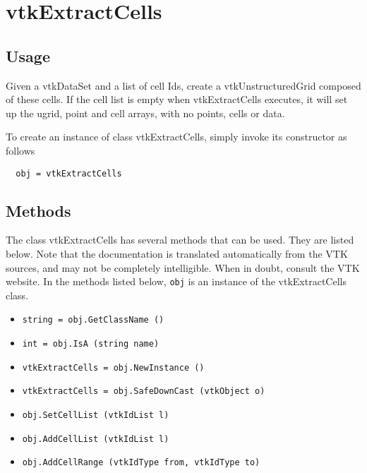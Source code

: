 \section{vtkExtractCells}

\subsection{Usage}

    Given a vtkDataSet and a list of cell Ids, create a vtkUnstructuredGrid
    composed of these cells.  If the cell list is empty when vtkExtractCells 
    executes, it will set up the ugrid, point and cell arrays, with no points, 
    cells or data.

To create an instance of class vtkExtractCells, simply
invoke its constructor as follows
\begin{verbatim}
  obj = vtkExtractCells
\end{verbatim}
\subsection{Methods}

The class vtkExtractCells has several methods that can be used.
  They are listed below.
Note that the documentation is translated automatically from the VTK sources,
and may not be completely intelligible.  When in doubt, consult the VTK website.
In the methods listed below, \verb|obj| is an instance of the vtkExtractCells class.
\begin{itemize}
\item  \verb|string = obj.GetClassName ()|

\item  \verb|int = obj.IsA (string name)|

\item  \verb|vtkExtractCells = obj.NewInstance ()|

\item  \verb|vtkExtractCells = obj.SafeDownCast (vtkObject o)|

\item  \verb|obj.SetCellList (vtkIdList l)|

\item  \verb|obj.AddCellList (vtkIdList l)|

\item  \verb|obj.AddCellRange (vtkIdType from, vtkIdType to)|

\end{itemize}
